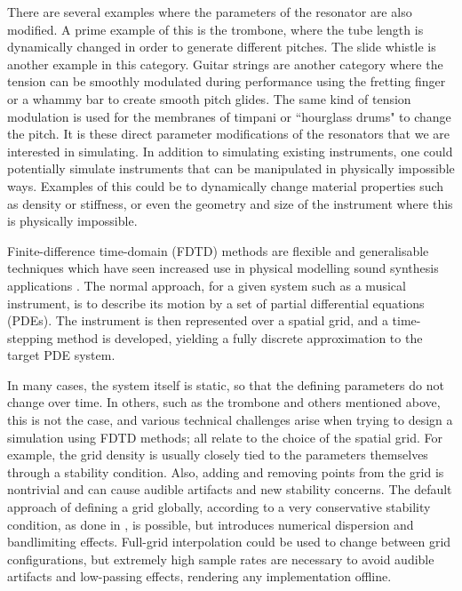 There are several examples where the parameters of the resonator are also modified. A prime example of this is the trombone, where the tube length is dynamically changed in order to generate different pitches. The slide whistle is another example in this category. Guitar strings are another category where the tension can be smoothly modulated during performance using the fretting finger or a whammy bar  %
to create smooth pitch glides. The same kind of tension modulation is used for the membranes of timpani or ``hourglass drums" to change the pitch. 
It is these direct parameter modifications of the resonators that we are interested in simulating. In addition to simulating existing instruments, one could potentially simulate instruments that can be manipulated in physically impossible ways. Examples of this could be to dynamically change material properties such as density or stiffness, or even the geometry and size of the instrument where this is physically impossible.

Finite-difference time-domain (FDTD) methods are flexible and generalisable techniques which have seen increased use in physical modelling sound synthesis applications \cite{bilbao2009}. The normal approach, for a given system such as a musical instrument, is to describe its motion by a set of partial differential equations (PDEs). The instrument is then represented over a spatial grid, and a time-stepping method is developed, yielding a fully discrete approximation to the target PDE system. 

In many cases, the system itself is static, so that the defining parameters do not change over time. In others, such as the trombone and others mentioned above, this is not the case, and various technical challenges arise when trying to design a simulation using FDTD methods; all relate to the choice of the spatial grid. For example, the grid density is usually closely tied to the parameters themselves through a stability condition.
Also, adding and removing points from the grid is nontrivial and can cause audible artifacts and new stability concerns. The default approach of defining a grid globally, according to a very conservative stability condition, as done in \cite{Willemsen2019}, is possible, but introduces numerical dispersion and bandlimiting effects. Full-grid interpolation \cite[Ch. 5]{bilbao2009} could be used to change between grid configurations, but extremely high sample rates are necessary to avoid audible artifacts and low-passing effects, rendering any implementation offline. 

